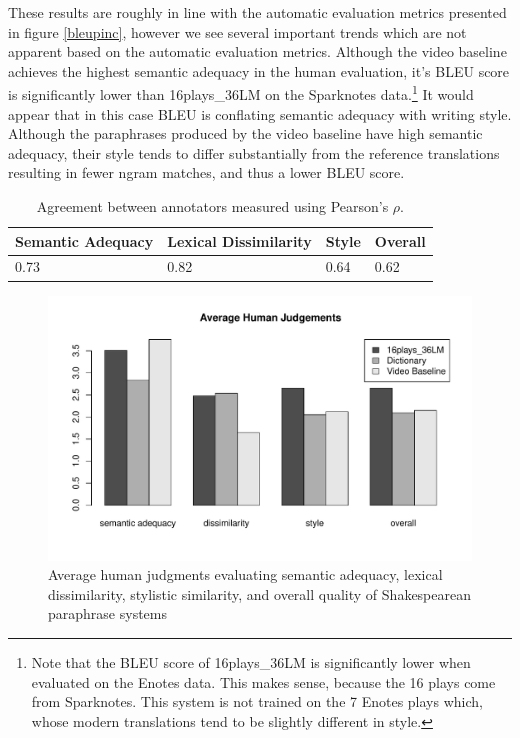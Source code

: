 \documentclass[10pt,a5paper,twoside]{article}
\begin{document}
These results are roughly in line with the automatic evaluation metrics presented in figure \ref{bleupinc}, however we see several important
trends which are not apparent based on the automatic evaluation metrics.
Although the video baseline achieves the highest semantic adequacy in the human evaluation, it's BLEU score
is significantly lower than 16plays\_36LM on the Sparknotes data.\footnote{
Note that the BLEU score of 16plays\_36LM is significantly lower when evaluated on the Enotes data.  This makes sense, because the 
16 plays come from Sparknotes. This system is not trained on the 7 Enotes plays which, whose modern translations tend
to be slightly different in style.}
It would appear that in this case BLEU is conflating semantic adequacy with writing style.  Although the paraphrases produced 
by the video baseline have high semantic adequacy, their style tends to differ substantially from the reference translations resulting
in fewer ngram matches, and thus a lower BLEU score.

\begin{table}
  \begin{center}
    \begin{tabular}{|l|l|l|l|}
      \hline
      Semantic Adequacy & Lexical Dissimilarity & Style & Overall \\
      \hline
      \hline
      0.73 & 0.82 & 0.64 & 0.62 \\
      \hline
    \end{tabular}
  \end{center}
  \caption{Agreement between annotators measured using Pearson's $\rho$.}
  \label{annotator_agreement}
\end{table}

\begin{figure}[ht]
  \begin{center}
    \includegraphics[width=5in]{figures/human_judgements.pdf}
  \end{center}
  \caption{Average human judgments evaluating semantic adequacy, lexical dissimilarity, stylistic similarity, and overall quality
    of Shakespearean paraphrase systems} 
  \label{human_judgements}
\end{figure}
\end{document}
